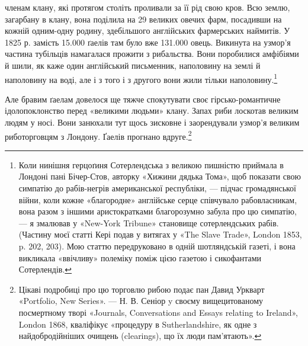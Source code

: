 членам клану, які протягом століть проливали за її рід свою кров.
Всю землю, загарбану в клану, вона поділила на 29 великих
овечих фарм, посадивши на кожній одним-одну родину, здебільшого
англійських фармерських наймитів. У 1825 р. замість
15.000 ґаелів там було вже 131.000 овець. Викинута на узмор’я
частина тубільців намагалася прожити з рибальства. Вони поробилися
амфібіями й шили, як каже один англійський письменник,
наполовину на землі й наполовину на воді, але і з того
і з другого вони жили тільки наполовину.\footnote{
Коли нинішня герцоґиня Сотерлендська з великою пишністю
приймала в Лондоні пані Бічер-Стов, авторку «Хижини дядька Тома»,
щоб показати свою симпатію до рабів-негрів американської республіки, —
підчас громадянської війни, коли кожне «благородне» англійське серце
співчувало рабовласникам, вона разом з іншими аристократками благорозумно
забула про цю симпатію, — я змалював у «New-York Tribune»
становище сотерлендських рабів. (Частину моєї статті Кері подав у витягах
у «The Slave Trade», London 1853, p. 202, 203). Мою статтю передруковано
в одній шотляндській газеті, і вона викликала «ввічливу» полеміку
поміж цією газетою і сикофантами Сотерлендів.
}

Але бравим ґаелам довелося ще тяжче спокутувати своє гірсько-романтичне
ідолопоклонство перед «великими людьми»
клану. Запах риби лоскотав великим людям у носі. Вони занюхали
тут щось зисковне і заорендували узмор’я великим риботорговцям
з Лондону. Ґаелів прогнано вдруге.\footnote{
Цікаві подробиці про цю торговлю рибою подає пан Давид Уркварт
«Portfolio, New Series». — Н. В. Сеніор y своєму вищецитованому посмертному
творі «Journals, Conversations and Essays relating to Ireland»,
London 1868, кваліфікує «процедуру в Sutherlandshire, як одне з найдобродійніших
очищень (clearings), що їх люди пам’ятають».
}

